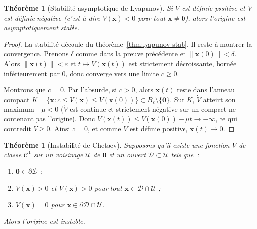 \documentclass[12pt,a4paper,openany]{book}
\theoremstyle{definition}
\theoremstyle{plain}
\newtheorem{theoreme}[definition]{Théorème}
\theoremstyle{remark}
\newcommand{\norm}[1]{\left\|#1\right\|}
\begin{document}
\begin{theoreme}[Stabilité asymptotique de Lyapunov]\label{thm:lyapunov-asympt}
  Si $V$ est définie positive et $\dot{V}$ est \emph{définie
  négative} (c'est-à-dire $\dot{V}(\mathbf{x})<0$ pour tout
  $\mathbf{x}\neq\mathbf{0}$), alors l'origine est
  \emph{asymptotiquement stable}.
\end{theoreme}

\begin{proof}
  La stabilité découle du théorème~\ref{thm:lyapunov-stab}. Il reste
  à montrer la convergence. Prenons $\delta$ comme dans la preuve
  précédente et $\norm{\mathbf{x}(0)}<\delta$. Alors
  $\norm{\mathbf{x}(t)}<\varepsilon$ et $t\mapsto V(\mathbf{x}(t))$
  est strictement décroissante, bornée inférieurement par $0$, donc
  converge vers une limite $c\geq 0$.

  Montrons que $c=0$. Par l'absurde, si $c>0$, alors
  $\mathbf{x}(t)$ reste dans l'anneau compact
  $K=\{\mathbf{x}:c\leq V(\mathbf{x})\leq V(\mathbf{x}(0))\}\subset
  \bar{B}_\varepsilon\setminus\{\mathbf{0}\}$.
  Sur $K$, $\dot{V}$ atteint son maximum $-\mu<0$ ($\dot{V}$ est
  continue et strictement négative sur un compact ne contenant pas
  l'origine). Donc
  $V(\mathbf{x}(t))\leq V(\mathbf{x}(0))-\mu t\to-\infty$, ce qui
  contredit $V\geq 0$. Ainsi $c=0$, et comme $V$ est définie positive,
  $\mathbf{x}(t)\to\mathbf{0}$.
\end{proof}

\begin{theoreme}[Instabilité de Chetaev]\label{thm:chetaev}
  Supposons qu'il existe une fonction $V$ de classe $\mathcal{C}^1$
  sur un voisinage $\mathcal{U}$ de $\mathbf{0}$ et un ouvert
  $\mathcal{D}\subset\mathcal{U}$ tels que~:
  \begin{enumerate}[label=(\roman*)]
    \item $\mathbf{0}\in\partial\mathcal{D}$ ;
    \item $V(\mathbf{x})>0$ et $\dot{V}(\mathbf{x})>0$ pour tout
      $\mathbf{x}\in\mathcal{D}\cap\mathcal{U}$ ;
    \item $V(\mathbf{x})=0$ pour $\mathbf{x}\in\partial\mathcal{D}\cap\mathcal{U}$.
  \end{enumerate}
  Alors l'origine est \emph{instable}.
\end{theoreme}
\end{document}

